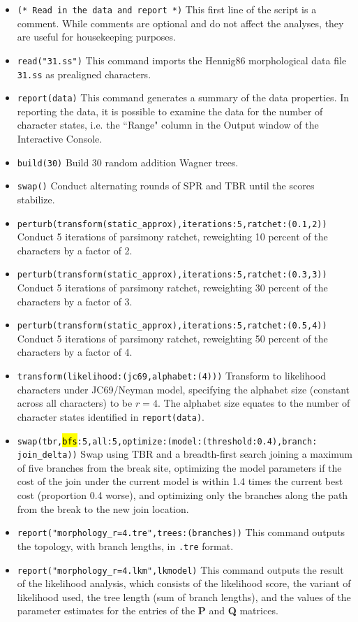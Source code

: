 \begin{itemize}
\item \texttt{(* Read in the data and report *)} This first line of the script is a comment. While comments are optional and do 
not affect the analyses, they are useful for housekeeping purposes.
\item \texttt{read("31.ss")}
This command imports the Hennig86 morphological data file \texttt{31.ss} as prealigned characters. 
\item \texttt{report(data)} This command generates a summary of the data properties. In reporting the data, it is possible to 
examine the data for the number of character states, i.e. the ``Range" column in the \poy Output window of the Interactive
Console. 
\item \texttt{build(30)} Build 30 random addition Wagner trees.
\item \texttt{swap()} Conduct alternating rounds of SPR and TBR until the scores stabilize.

\item \texttt{perturb(transform(static\_approx),iterations:5,ratchet:(0.1,2))} Conduct 5 iterations of parsimony ratchet,
reweighting 10 percent of the characters by a factor of 2.
\item \texttt{perturb(transform(static\_approx),iterations:5,ratchet:(0.3,3))} Conduct 5 iterations of parsimony ratchet,
reweighting 30 percent of the characters by a factor of 3.
\item \texttt{perturb(transform(static\_approx),iterations:5,ratchet:(0.5,4))} Conduct 5 iterations of parsimony ratchet,
reweighting 50 percent of the characters by a factor of 4.
\item \texttt{transform(likelihood:(jc69,alphabet:(4)))} Transform to likelihood characters under JC69/Neyman model, 
specifying the alphabet size (constant across all characters) to be $r=4$. The alphabet size equates to the number of 
character states identified in \texttt{report(data)}.
\item \texttt{swap(tbr,\hl{bfs}:5,all:5,optimize:(model:(threshold:0.4),branch:\\join\_delta))} Swap using TBR and a 
breadth-first search joining a maximum of five branches from the break site, optimizing the model parameters if the 
cost of the join under the current model is within 1.4 times the current best cost (proportion 0.4 worse), and optimizing 
only the branches along the path from the break to the new join location. 
\item \texttt{report("morphology\_r=4.tre",trees:(branches))} This command outputs the topology, with branch lengths, in 
\texttt{.tre} format.
\item \texttt{report("morphology\_r=4.lkm",lkmodel)} This command outputs the result of the likelihood analysis, which 
consists of the likelihood score, the variant of likelihood used, the tree length (sum of branch lengths), and the values 
of the parameter estimates for the entries of the \textbf{P} and \textbf{Q} matrices.


\end{itemize}
